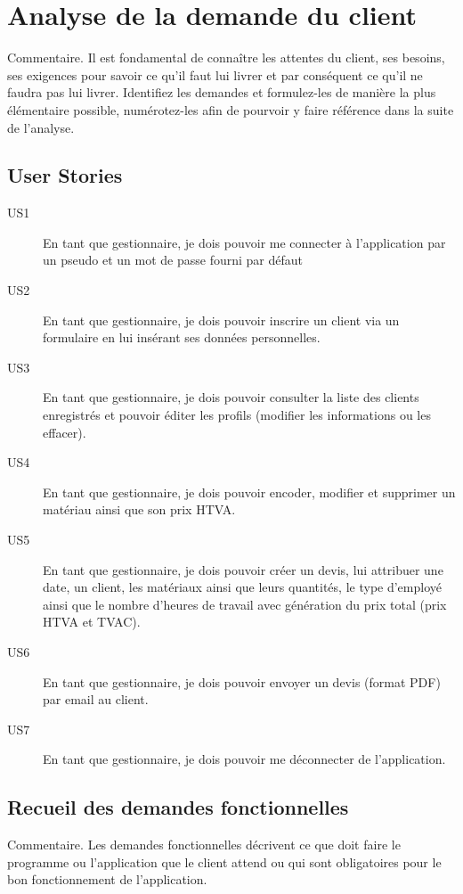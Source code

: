 \section{Analyse de la demande du client}
Commentaire.  Il est fondamental de connaître les attentes du client, ses besoins, ses exigences pour savoir ce qu’il faut lui livrer et par conséquent ce qu’il ne faudra pas lui livrer.  Identifiez les demandes et formulez-les de manière la plus élémentaire possible, numérotez-les afin de pourvoir y faire référence dans la suite de l’analyse.

\subsection{User Stories}

\begin{description}
 \item[US1] En tant que gestionnaire, je dois pouvoir me connecter à l'application par un pseudo et un mot de passe fourni par défaut 
  \item[US2] En tant que gestionnaire, je dois pouvoir inscrire un client via un formulaire en lui insérant ses données personnelles. 
  \item[US3] En tant que gestionnaire, je dois pouvoir consulter la liste des clients enregistrés et pouvoir éditer les profils (modifier les informations ou les effacer).
  \item[US4] En tant que gestionnaire, je dois pouvoir encoder, modifier et supprimer un matériau ainsi que son prix HTVA.
  \item[US5] En tant que gestionnaire, je dois pouvoir créer un devis, lui attribuer une date, un client,  les matériaux ainsi que leurs quantités, le type d'employé ainsi que le nombre d'heures de travail avec génération du prix total (prix HTVA et TVAC). 
  \item[US6] En tant que gestionnaire, je dois pouvoir envoyer un devis (format PDF) par email au client.
  \item[US7] En tant que gestionnaire, je dois pouvoir me déconnecter de l'application.
 \end{description}

\subsection{Recueil des demandes fonctionnelles}

Commentaire.  Les demandes fonctionnelles décrivent ce que doit faire le programme ou l’application que le client attend ou qui sont obligatoires pour le bon fonctionnement de l’application.


